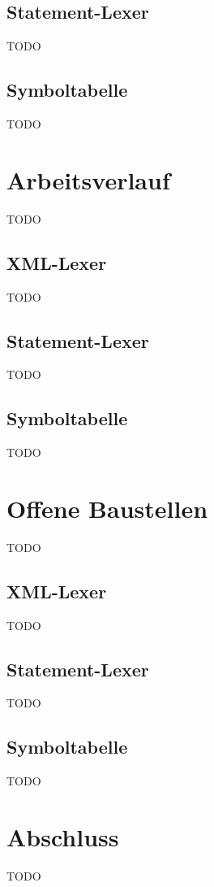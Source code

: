 \documentclass[10pt,a4paper,ngerman,titlepage,tocindentauto]{article}
\begin{document}
		\subsection{Statement-Lexer}
			TODO
	
		\subsection{Symboltabelle}
			TODO
	
	\section{Arbeitsverlauf}
		TODO
	
		\subsection{XML-Lexer}
			TODO
	
		\subsection{Statement-Lexer}
			TODO
	
		\subsection{Symboltabelle}
			TODO
	
	\section{Offene Baustellen}
		TODO
	
		\subsection{XML-Lexer}
			TODO
	
		\subsection{Statement-Lexer}
			TODO
	
		\subsection{Symboltabelle}
			TODO
	
	\section{Abschluss}
		TODO
	
\end{document}
